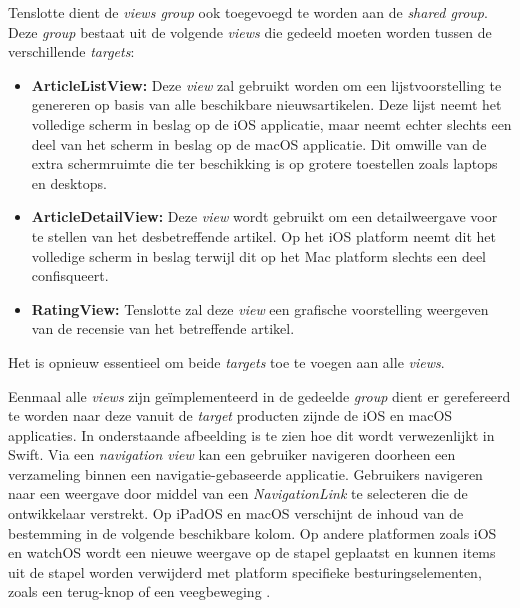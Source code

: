 Tenslotte dient de \textit{views group} ook toegevoegd te worden aan de \textit{shared group}. Deze \textit{group} bestaat uit de volgende \textit{views} die gedeeld moeten worden tussen de verschillende \textit{targets}:

\begin{itemize}
    \item \textbf{ArticleListView:} Deze \textit{view} zal gebruikt worden om een lijstvoorstelling te genereren op basis van alle beschikbare nieuwsartikelen. Deze lijst neemt het volledige scherm in beslag op de iOS applicatie, maar neemt echter slechts een deel van het scherm in beslag op de macOS applicatie. Dit omwille van de extra schermruimte die ter beschikking is op grotere toestellen zoals laptops en desktops.
    \item \textbf{ArticleDetailView:} Deze \textit{view} wordt gebruikt om een detailweergave voor te stellen van het desbetreffende artikel. Op het iOS platform neemt dit het volledige scherm in beslag terwijl dit op het Mac platform slechts een deel confisqueert. 
    \item \textbf{RatingView:} Tenslotte zal deze \textit{view} een grafische voorstelling weergeven van de recensie van het betreffende artikel. 
\end{itemize}

Het is opnieuw essentieel om beide \textit{targets} toe te voegen aan alle \textit{views}.

\pagebreak
Eenmaal alle \textit{views} zijn geïmplementeerd in de gedeelde \textit{group} dient er gerefereerd te worden naar deze vanuit de \textit{target} producten zijnde de iOS en macOS applicaties. In onderstaande afbeelding is te zien hoe dit wordt verwezenlijkt in Swift. Via een \textit{navigation view} kan een gebruiker navigeren doorheen een verzameling binnen een navigatie-gebaseerde applicatie. Gebruikers navigeren naar een weergave door middel van een \textit{NavigationLink} te selecteren die de ontwikkelaar verstrekt. Op iPadOS en macOS verschijnt de inhoud van de bestemming in de volgende beschikbare kolom. Op andere platformen zoals iOS en watchOS wordt een nieuwe weergave op de stapel geplaatst en kunnen items uit de stapel worden verwijderd met platform specifieke besturingselementen, zoals een terug-knop of een veegbeweging \autocite{AppleDeveloper2022c}.

